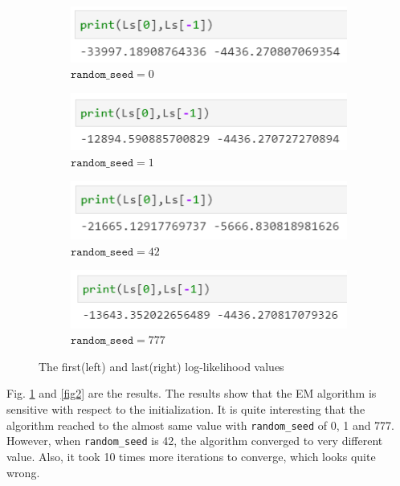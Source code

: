 \documentclass[11pt]{article}
\begin{document}
\begin{figure}[H]
    \begin{subfigure}[H]{0.5\textwidth}
        \includegraphics[width=1\linewidth]{img/final_0.PNG}
        \caption{$\texttt{random\_seed}=0$}\vspace{2mm}
    \end{subfigure}
    \begin{subfigure}[H]{0.5\textwidth}
        \includegraphics[width=1\linewidth]{img/final_1.PNG}
        \caption{$\texttt{random\_seed}=1$}\vspace{2mm}
    \end{subfigure}
    \begin{subfigure}[H]{0.5\textwidth}
        \includegraphics[width=1\linewidth]{img/final_42.PNG}
        \caption{$\texttt{random\_seed}=42$}
    \end{subfigure}
    \begin{subfigure}[H]{0.5\textwidth}
        \includegraphics[width=1\linewidth]{img/final_777.PNG}
        \caption{$\texttt{random\_seed}=777$}
    \end{subfigure}
    \caption{The first(left) and last(right) log-likelihood values}
    \label{fig1}
\end{figure}
Fig. \ref{fig1} and \ref{fig2} are the results. The results show that the EM algorithm is sensitive with respect to the initialization. It is quite interesting that the algorithm reached to the almost same value with \texttt{random\_seed} of 0, 1 and 777. However, when \texttt{random\_seed} is 42, the algorithm converged to very different value. Also, it took 10 times more iterations to converge, which looks quite wrong.
\end{document}
